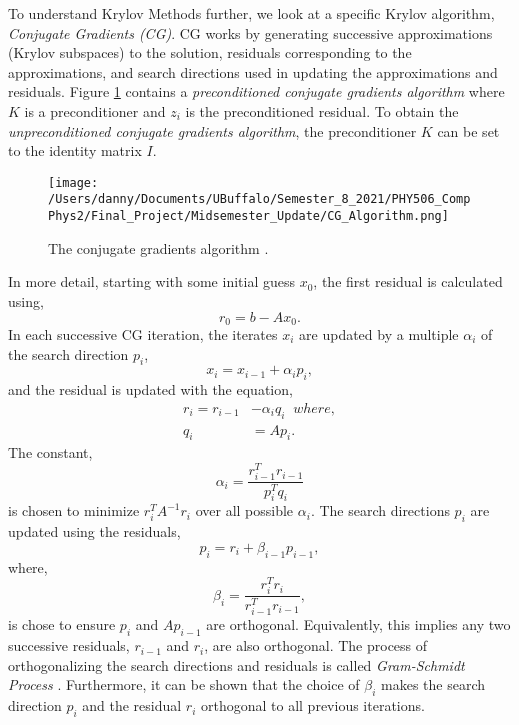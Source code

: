 \documentclass[]{article}
\theoremstyle{definition}
\begin{document}
To understand Krylov Methods further, we look at a specific Krylov algorithm, \textit{Conjugate Gradients (CG)}.  CG works by generating successive approximations (Krylov subspaces) to the solution, residuals corresponding to the approximations, and search directions  used in updating the approximations and residuals.  Figure \ref{CGAlg} contains a \textit{preconditioned conjugate gradients algorithm} where $K$ is a preconditioner and $z_i$ is the preconditioned residual. To obtain the \textit{unpreconditioned conjugate gradients algorithm}, the preconditioner $K$ can be set to the identity matrix $I$.
\begin{figure}[!ht]
\begin{center}
\texttt{[image: /Users/danny/Documents/UBuffalo/Semester\_8\_2021/PHY506\_CompPhys2/Final\_Project/Midsemester\_Update/CG\_Algorithm.png]}
\end{center}
\caption{The conjugate gradients algorithm \cite{Henk2000}.}
\label{CGAlg}
\end{figure}
In more detail, starting with some initial guess $x_0$,  the first residual is calculated using, 
\begin{equation}
r_0 = b - A x_0.
\end{equation}
In each successive CG iteration, the iterates $x_i$ are updated by a multiple $\alpha_i$ of the search direction $p_i$, 
\begin{equation}
x_i = x_{i-1} + \alpha_i p_i,
\end{equation}
and the residual is updated with the equation,
\begin{align}
r_i = r_{i-1} &- \alpha_i q_i \;\; where, \\
q_i &= A p_i.
\end{align}
The constant,
\begin{equation}
\alpha_i = \frac{r_{i-1}^T r_{i-1}}{p_i^T q_i} 
\end{equation}
is chosen to minimize $r_i^T A^{-1} r_i$ over all possible $\alpha_i$.  The search directions $p_i$ are updated using the residuals,
\begin{equation}
p_i = r_i + \beta_{i-1} p_{i-1},
\end{equation}
where,
\begin{equation}
\beta_i = \frac{r_{i}^T r_{i}}{r_{i-1}^T r_{i-1}},
\end{equation}
is chose to ensure $p_i$ and $Ap_{i-1}$ are orthogonal.  Equivalently, this implies any two successive residuals, $r_{i-1}$ and $r_i$, are also orthogonal.  The process of orthogonalizing the search directions and residuals is called \textit{Gram-Schmidt Process} \cite{Keener2000}.  Furthermore, it can be shown that the choice of $\beta_i$ makes the search direction $p_i$ and the residual $r_i$ orthogonal to all previous iterations. 
\end{document}
